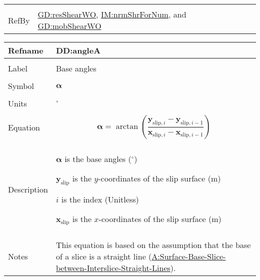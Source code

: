 \documentclass[12pt]{article}
\begin{document}
\begin{minipage}{\textwidth}
\begin{tabular}{>{\raggedright}p{}>{\raggedright\arraybackslash}p{}}
\\ \midrule \\
RefBy & \hyperref[GD:resShearWO]{GD:resShearWO}, \hyperref[IM:nrmShrForNum]{IM:nrmShrForNum}, and \hyperref[GD:mobShearWO]{GD:mobShearWO}
        
\\ \bottomrule
\end{tabular}
\end{minipage}

\vspace{\baselineskip}
\noindent
\begin{minipage}{\textwidth}
\begin{tabular}{>{\raggedright}p{}>{\raggedright\arraybackslash}p{}}
\toprule \textbf{Refname} & \textbf{DD:angleA}
\label{DD:angleA}
\\ \midrule \\
Label & Base angles
        
\\ \midrule \\
Symbol & $\symbf{α}$
         
\\ \midrule \\
Units & ${{}^{\circ}}$
        
\\ \midrule \\
Equation & \begin{displaymath}
           \symbf{α}=\arctan\left(\frac{{\symbf{y}_{\text{slip},i}}-{\symbf{y}_{\text{slip},i-1}}}{{\symbf{x}_{\text{slip},i}}-{\symbf{x}_{\text{slip},i-1}}}\right)
           \end{displaymath}
\\ \midrule \\
Description & \begin{symbDescription}
              \item{$\symbf{α}$ is the base angles (${{}^{\circ}}$)}
              \item{${\symbf{y}_{\text{slip}}}$ is the $y$-coordinates of the slip surface (${\text{m}}$)}
              \item{$i$ is the index (Unitless)}
              \item{${\symbf{x}_{\text{slip}}}$ is the $x$-coordinates of the slip surface (${\text{m}}$)}
              \end{symbDescription}
\\ \midrule \\
Notes & This equation is based on the assumption that the base of a slice is a straight line (\hyperref[assumpSBSBISL]{A:Surface-Base-Slice-between-Interslice-Straight-Lines}).
        

\end{tabular}
\end{minipage}
\end{document}
